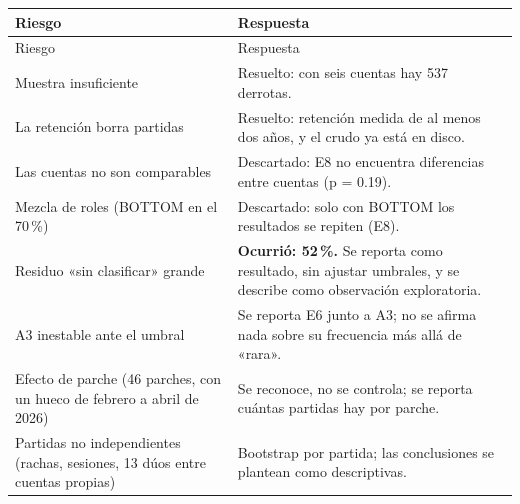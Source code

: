 \documentclass[11pt,letterpaper]{article}
\begin{document}
\begin{longtable}{p{5.0cm}p{9.6cm}}
\toprule
Riesgo & Respuesta \\
\midrule
\endfirsthead
\toprule
Riesgo & Respuesta \\
\midrule
\endhead
\textcolor{suave}{Muestra insuficiente} & \textcolor{suave}{Resuelto: con seis cuentas hay 537 derrotas.} \\
\addlinespace
\textcolor{suave}{La retención borra partidas} & \textcolor{suave}{Resuelto: retención medida de al menos dos años, y el crudo ya está en disco.} \\
\addlinespace
\textcolor{suave}{Las cuentas no son comparables} & \textcolor{suave}{Descartado: E8 no encuentra diferencias entre cuentas (p = 0.19).} \\
\addlinespace
\textcolor{suave}{Mezcla de roles (BOTTOM en el 70\,\%)} & \textcolor{suave}{Descartado: solo con BOTTOM los resultados se repiten (E8).} \\
\addlinespace
Residuo «sin clasificar» grande & \textbf{Ocurrió: 52\,\%.} Se reporta como resultado, sin ajustar umbrales, y se describe como observación exploratoria. \\
\addlinespace
A3 inestable ante el umbral & Se reporta E6 junto a A3; no se afirma nada sobre su frecuencia más allá de «rara». \\
\addlinespace
Efecto de parche (46 parches, con un hueco de febrero a abril de 2026) & Se reconoce, no se controla; se reporta cuántas partidas hay por parche. \\
\addlinespace
Partidas no independientes (rachas, sesiones, 13 dúos entre cuentas propias) & Bootstrap por partida; las conclusiones se plantean como descriptivas. \\
\bottomrule
\end{longtable}

\vspace{.5cm}
\end{document}
